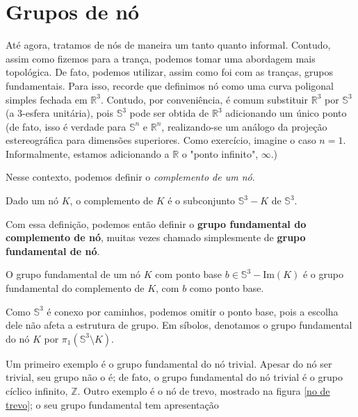 	\section{Grupos de nó}
	\hspace{12pt} Até agora, tratamos de nós de maneira um tanto quanto informal. Contudo, assim como fizemos para a trança, podemos tomar uma abordagem mais topológica. De fato, podemos utilizar, assim como foi com as tranças, grupos fundamentais. Para isso, recorde que definimos nó como uma curva poligonal simples fechada em $\mathbb{R}^3$. Contudo, por conveniência, é comum substituir $\mathbb{R}^3$ por $\mathbb{S}^3$ (a 3-esfera unitária), pois $\mathbb{S}^3$ pode ser obtida de $\mathbb{R}^3$ adicionando um único ponto (de fato, isso é verdade para $\mathbb{S}^n$ e $\mathbb{R}^n$, realizando-se um análogo da projeção estereográfica para dimensões superiores. Como exercício, imagine o caso $n = 1$. Informalmente, estamos adicionando a $\mathbb{R}$ o "ponto infinito", $\infty$.)
	\par\vspace{0.3cm} Nesse contexto, podemos definir o \textit{complemento de um nó}.
	\begin{deff}
		\label{def complemento no}
		Dado um nó $K$, o complemento de $K$ é o subconjunto $\mathbb{S}^3 - K$ de $\mathbb{S}^3$.
	\end{deff}
	\par\vspace{0.3cm} Com essa definição, podemos então definir o \textbf{grupo fundamental do complemento de nó}, muitas vezes chamado simplesmente de \textbf{grupo fundamental de nó}.
	\begin{deff}
		\label{grupo fundamental de no}
		O grupo fundamental de um nó $K$ com ponto base $b\in\mathbb{S}^3 - \text{Im}(K)$ é o grupo fundamental do complemento de $K$, com $b$ como ponto base.
	\end{deff}
	\par\vspace{0.3cm} Como $\mathbb{S}^3$ é conexo por caminhos, podemos omitir o ponto base, pois a escolha dele não afeta a estrutura de grupo. Em síbolos, denotamos o grupo fundamental do nó $K$ por $\pi_1(\mathbb{S}^3\setminus K)$. 
	\par\vspace{0.3cm} Um primeiro exemplo é o grupo fundamental do nó trivial. Apesar do nó ser trivial, seu grupo não o é; de fato, o grupo fundamental do nó trivial é o grupo cíclico infinito, $\mathbb{Z}$. Outro exemplo é o nó de trevo, mostrado na figura \eqref{no de trevo}; o seu grupo fundamental tem apresentação 
